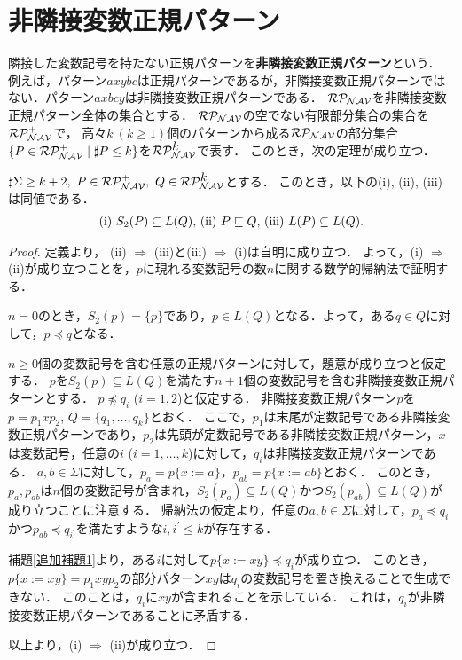 \section{非隣接変数正規パターン}

隣接した変数記号を持たない正規パターンを\textbf{非隣接変数正規パターン}という．
例えば，パターン$axybc$は正規パターンであるが，非隣接変数正規パターンではない．パターン$axbcy$は非隣接変数正規パターンである．
$\mathcal{RP_{NAV}}$を非隣接変数正規パターン全体の集合とする．
$\mathcal{RP_{NAV}}$の空でない有限部分集合の集合を$\mathcal{RP^{+}_{NAV}}$で，
高々$k~(k\geq 1)$個のパターンから成る$\mathcal{RP_{NAV}}$の部分集合$\{P\in \mathcal{RP^{+}_{NAV}} \mid \sharp P \leq k\}$を$\mathcal{RP^{\mbox{$k$}}_{NAV}}$で表す．
このとき，次の定理が成り立つ．

\begin{thm}\label{非隣接kが4以上}
$\sharp \Sigma \ge k+2,~P\in \mathcal{RP^{+}_{NAV}},~Q \in \mathcal{RP^{\mbox{$k$}}_{NAV}}$とする．
このとき，以下の{\rm (i), (ii), (iii)}は同値である．
\[
\begin{tabular}{ll}
$(\mathrm{i})$ $S_{2}(P) \subseteq L(Q)$,
$(\mathrm{ii})$ $P \sqsubseteq Q$,
$(\mathrm{iii})$ $L(P) \subseteq L(Q)$.
\end{tabular}
\]
\end{thm}

\begin{proof}
定義より，
(ii) $\Rightarrow$ (iii)と(iii) $\Rightarrow$ (i)は自明に成り立つ．
よって，(i) $\Rightarrow$ (ii)が成り立つことを，$p$に現れる変数記号の数$n$に関する数学的帰納法で証明する．

$n=0$のとき，$S_{2}(p)= \{ p \}$であり，$p \in L(Q)$となる．よって，ある$q \in Q$に対して，$p \preceq q$となる．

$n \ge 0$個の変数記号を含む任意の正規パターンに対して，題意が成り立つと仮定する．
$p$を$S_{2}(p) \subseteq L(Q)$を満たす$n+1$個の変数記号を含む非隣接変数正規パターンとする．
$p \not \preceq q_{i}$ ($i=1, 2$)と仮定する．
非隣接変数正規パターン$p$を$p=p_{1}xp_{2}$, $Q=\{ q_{1}, \ldots , q_{k} \}$とおく．
ここで，$p_{1}$は末尾が定数記号である非隣接変数正規パターンであり，$p_{2}$は先頭が定数記号である非隣接変数正規パターン，$x$は変数記号，任意の$i$ ($i=1, \ldots, k$)に対して，$q_{i}$は非隣接変数正規パターンである．
$a, b \in \Sigma$に対して，$p_{a}=p \{ x := a \}$，$p_{ab}=p \{ x := ab \}$とおく．
このとき，$p_{a}, p_{ab}$は$n$個の変数記号が含まれ，$S_{2}(p_{a}) \subseteq L(Q)$かつ$S_{2}(p_{ab}) \subseteq L(Q)$が成り立つことに注意する．
帰納法の仮定より，任意の$a, b \in \Sigma$に対して，$p_{a} \preceq q_{i}$かつ$p_{ab} \preceq q_{i^{\prime}}$を満たすような$i, i^{\prime} \le k$が存在する．

補題\ref{追加補題1}より，ある$i$に対して$p \{ x:=xy \} \preceq q_{i}$が成り立つ．
このとき，$p \{ x:=xy \} =p_{1}xyp_{2}$の部分パターン$xy$は$q_{i}$の変数記号を置き換えることで生成できない．
このことは，$q_{i}$に$xy$が含まれることを示している．
これは，$q_{i}$が非隣接変数正規パターンであることに矛盾する．

以上より，(i) $\Rightarrow$ (ii)が成り立つ．
\end{proof}

